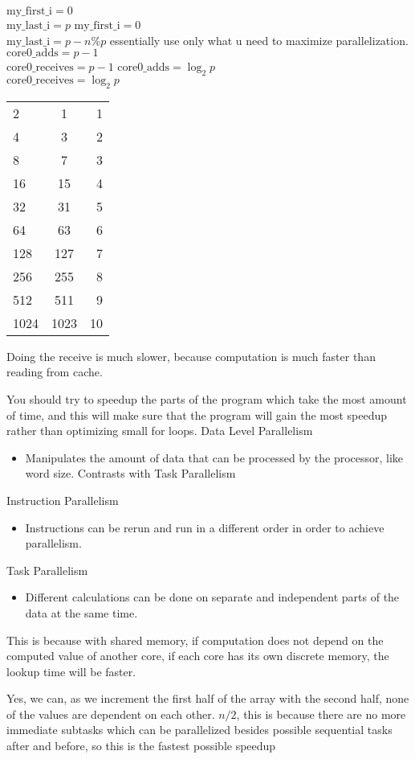 \documentclass{hw121}              %
\begin{document}
	\hwproblem
	\hwsubproblem
	$\mathrm{my\_first\_i} = 0 $\\
	$\mathrm{my\_last\_i} = p $
	\hwsubproblem
		$\mathrm{my\_first\_i} = 0 $\\
	$\mathrm{my\_last\_i} = p - n\%p$   essentially use only what u need to maximize parallelization.
	\hwproblem
	\hwsubproblem
	$\mathrm{core0\_adds} = p-1$\\
	$\mathrm{core0\_receives} = p-1$
	\hwsubproblem
		$\mathrm{core0\_adds} = \log_2{p}$\\
	$\mathrm{core0\_receives} = \log_2{p}$
	\hwsubproblem
	\begin{tabular}{ l | c | r }
		2 & 1 & 1 \\
		4 & 3 & 2 \\
		8 & 7 & 3 \\
		16 & 15 & 4 \\
		32 & 31 & 5 \\
		64 & 63 & 6 \\
		128 & 127 & 7 \\
		256 & 255 & 8 \\
		512 & 511 & 9 \\
		1024 & 1023 & 10 \\
	\end{tabular}
	\hwsubproblem
	Doing the receive is much slower, because computation is much faster than reading from cache.
	
	\hwproblem
		You should try to speedup the parts of the program which take the most amount of time, and this will make sure that the program will gain the most speedup rather than optimizing small for loops.
	\hwproblem
	Data Level Parallelism
	\begin{itemize}
		\item Manipulates the amount of data that can be processed by the processor, like word size. Contrasts with Task Parallelism
	\end{itemize}
	Instruction Parallelism
	\begin{itemize}
		\item Instructions can be rerun and run in a different order in order to achieve parallelism. 
	\end{itemize}
	Task Parallelism
	
	\begin{itemize}
		\item Different calculations can be done on separate and independent parts of the data at the same time. 
	\end{itemize}
	\hwproblem
		This is because with shared memory, if computation does not depend on the computed value of another core, if each core has its own discrete memory, the lookup time will be faster. 
	\hwproblem

	\hwsubproblem
	Yes, we can, as we increment the first half of the array with the second half, none of the values are dependent on each other. 
	\hwsubproblem
	$n/2$, this is because there are no more immediate subtasks which can be parallelized besides possible sequential tasks after and before, so this is the fastest possible speedup
	
	
\end{document}
